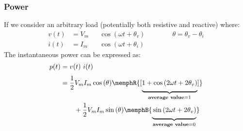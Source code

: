 \subsubsection{Power}

\begin{multicols}{2}

    \begin{CheatsheetEntryFrame}

        
        If we consider an arbitrary load (potentially both resistive and reactive) where:
        \begin{alignat*}{2}
            v(t) &= V_m && \cos{(\omega t + \theta_v)} \qquad \qquad \theta = \theta_v - \theta_i \\
            i(t) &= I_m && \cos{(\omega t + \theta_i)}
        \end{alignat*}
        The instantaneous power can be expressed as:
        \begin{align*}
            p(t)
                &= v(t)\ i(t) \vphantom{\frac{}{2}} \\ %
                &= \frac{1}{2} V_m I_m \cos{(\theta)} \memphR{[\underbrace{\vphantom{\frac{1}{2}} 1 + \cos{(2 \omega t + 2 \theta_v)}}_{\textbf{average value} = 1}]} \\
                &\qquad + \frac{1}{2} V_m I_m \sin{(\theta)} \memphB{\underbrace{\vphantom{\frac{1}{2}} \sin{(2 \omega t + 2 \theta_v)}}_{\textbf{average value} = 0}}
        \end{align*}

    \end{CheatsheetEntryFrame}

    \begin{CheatsheetEntryFrame}



\end{CheatsheetEntryFrame}
\end{multicols}
